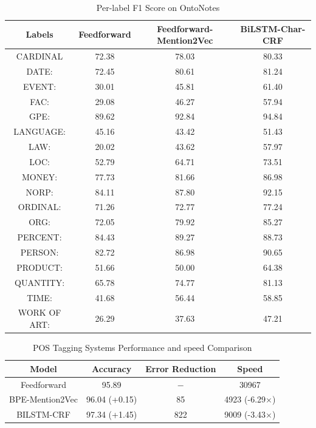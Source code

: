 \begin{table}[]
\centering
\caption{Per-label F1 Score on OntoNotes}
\label{table:ner-mention2vec3}
\begin{tabular}{|c|c|c|c|}
\hline
Labels             & Feedforward & Feedforward-Mention2Vec & BiLSTM-Char-CRF \\ \hline
         CARDINAL  & 72.38  & 78.03  & 80.33 \\ \hline
             DATE: & 72.45  & 80.61  & 81.24 \\ \hline
            EVENT: & 30.01  & 45.81  & 61.40 \\ \hline
              FAC: & 29.08  & 46.27  & 57.94 \\ \hline
              GPE: & 89.62  & 92.84  & 94.84 \\ \hline
         LANGUAGE: & 45.16  & 43.42  & 51.43 \\ \hline
              LAW: & 20.02  & 43.62  & 57.97 \\ \hline
              LOC: & 52.79  & 64.71  & 73.51 \\ \hline
            MONEY: & 77.73  & 81.66  & 86.98 \\ \hline
             NORP: & 84.11  & 87.80  & 92.15 \\ \hline
          ORDINAL: & 71.26  & 72.77  & 77.24 \\ \hline
              ORG: & 72.05  & 79.92  & 85.27 \\ \hline
          PERCENT: & 84.43  & 89.27  & 88.73 \\ \hline
           PERSON: & 82.72  & 86.98  & 90.65 \\ \hline
          PRODUCT: & 51.66  & 50.00  & 64.38 \\ \hline
         QUANTITY: & 65.78  & 74.77  & 81.13 \\ \hline
             TIME: & 41.68  & 56.44  & 58.85 \\ \hline
      WORK OF ART: & 26.29  & 37.63  & 47.21 \\ \hline
\end{tabular}
\end{table}

\begin{table}[]
\centering
\caption{POS Tagging Systems Performance and speed Comparison}
\label{table:pos-mention2vec}
\begin{tabular}{|c|c|c|c|}
\hline
Model   & Accuracy & Error Reduction & Speed \\ \hline
Feedforward     & 95.89  & $-$ & 30967  \\ \hline
BPE-Mention2Vec & 96.04 (+0.15) &85 & 4923 (-6.29$\times$)   \\ \hline
BILSTM-CRF & 97.34 (+1.45) &822 & 9009 (-3.43$\times$) \\ \hline
\end{tabular}
\end{table}

